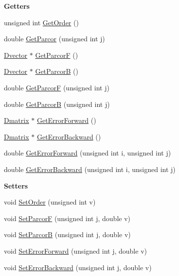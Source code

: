 \begin{Indent}\textbf{ Getters}\par
\begin{DoxyCompactItemize}
\item 
unsigned int \hyperlink{classtsa_1_1_lattice_view_a9aedf999a2129ae0b000ba6caded4b6b}{Get\+Order} ()
\item 
double \hyperlink{classtsa_1_1_lattice_view_a0549c29576047fa4e0c4871a23904951}{Get\+Parcor} (unsigned int j)
\item 
\hyperlink{namespacetsa_a8900fb03d849baf447a1a0efe2561fb2}{Dvector} $\ast$ \hyperlink{classtsa_1_1_lattice_view_a302999b98f7af945965749026dc655f9}{Get\+ParcorF} ()
\item 
\hyperlink{namespacetsa_a8900fb03d849baf447a1a0efe2561fb2}{Dvector} $\ast$ \hyperlink{classtsa_1_1_lattice_view_a166491c83511a3c64ec63c1aa5e2cbbd}{Get\+ParcorB} ()
\item 
double \hyperlink{classtsa_1_1_lattice_view_a941542e69cf15f8a41cfc17253cd5d48}{Get\+ParcorF} (unsigned int j)
\item 
double \hyperlink{classtsa_1_1_lattice_view_a14148e7fdd220c61791732bc14130bd9}{Get\+ParcorB} (unsigned int j)
\item 
\hyperlink{namespacetsa_ad260cd21c1891c4ed391fe788569aba4}{Dmatrix} $\ast$ \hyperlink{classtsa_1_1_lattice_view_a893dd18c7f1d423a8478a786c3c731c5}{Get\+Error\+Forward} ()
\item 
\hyperlink{namespacetsa_ad260cd21c1891c4ed391fe788569aba4}{Dmatrix} $\ast$ \hyperlink{classtsa_1_1_lattice_view_a8b682c3db5bcce323d107e4ba889795f}{Get\+Error\+Backward} ()
\item 
double \hyperlink{classtsa_1_1_lattice_view_ac9a4c9e01891d9c7c2ba5139c23ac86e}{Get\+Error\+Forward} (unsigned int i, unsigned int j)
\item 
double \hyperlink{classtsa_1_1_lattice_view_ae0bdb3cfb70274cf21c8681393d92a45}{Get\+Error\+Backward} (unsigned int i, unsigned int j)
\end{DoxyCompactItemize}
\end{Indent}
\begin{Indent}\textbf{ Setters}\par
\begin{DoxyCompactItemize}
\item 
void \hyperlink{classtsa_1_1_lattice_view_a0d555a7ff35604537e4391d4debd2d9a}{Set\+Order} (unsigned int v)
\item 
void \hyperlink{classtsa_1_1_lattice_view_a0e099a0196edb96d4e9265ea2901e6b9}{Set\+ParcorF} (unsigned int j, double v)
\item 
void \hyperlink{classtsa_1_1_lattice_view_ae2bb756238fc6873839459097717f3dc}{Set\+ParcorB} (unsigned int j, double v)
\item 
void \hyperlink{classtsa_1_1_lattice_view_a5d40a6a9e27b0ede53e2735983a83c6e}{Set\+Error\+Forward} (unsigned int j, double v)
\item 
void \hyperlink{classtsa_1_1_lattice_view_a80b37195a303625d69009cba7f8a0156}{Set\+Error\+Backward} (unsigned int j, double v)
\end{DoxyCompactItemize}
\end{Indent}
